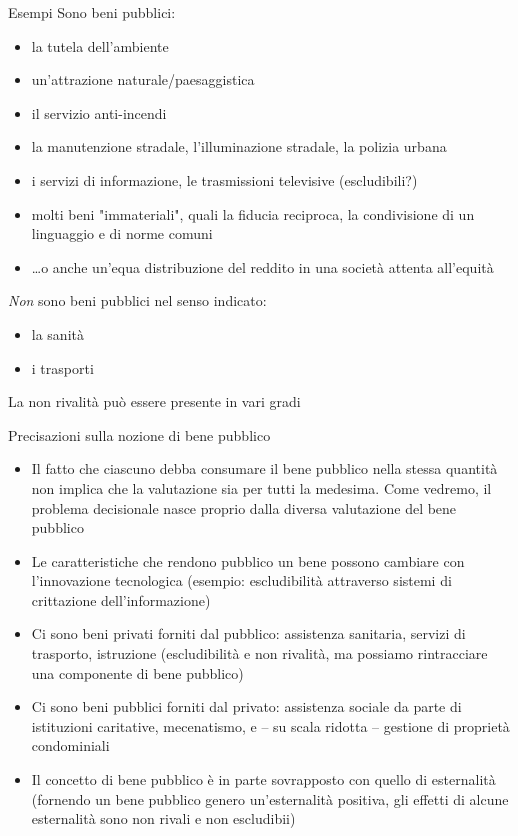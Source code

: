 \documentclass[aspectratio=64,11pt]{beamer}
\begin{document}
\begin{frame}{Esempi}
Sono beni pubblici:
\begin{itemize}
\item la tutela dell'ambiente
\item un'attrazione naturale/paesaggistica
\item il servizio anti-incendi
\item la manutenzione stradale, l'illuminazione stradale, la polizia urbana
\item i servizi di informazione, le trasmissioni televisive (escludibili?)
\item molti beni "immateriali", quali la fiducia reciproca, la condivisione di un linguaggio e di norme comuni
\item \ldots{}o anche un'equa distribuzione del reddito in una società attenta all'equità
\end{itemize}
\emph{Non} sono beni pubblici nel senso indicato:
\begin{itemize}
\item la sanità
\item i trasporti
\end{itemize}
La non rivalità può essere presente in vari gradi
\end{frame}


\begin{frame}{Precisazioni sulla nozione di bene pubblico}
\begin{itemize}
\item Il fatto che ciascuno debba consumare il bene pubblico nella stessa quantità non implica che la valutazione sia per tutti la medesima. Come vedremo, il problema decisionale nasce proprio dalla diversa valutazione del bene pubblico
\item Le caratteristiche che rendono pubblico un bene possono cambiare con l'innovazione tecnologica (esempio: escludibilità attraverso sistemi di crittazione dell'informazione)
\item Ci sono beni privati forniti dal pubblico: assistenza sanitaria, servizi di trasporto, istruzione (escludibilità e non rivalità, ma possiamo rintracciare una componente di bene pubblico)
\item Ci sono beni pubblici forniti dal privato: assistenza sociale da parte di istituzioni caritative, mecenatismo, e -- su scala ridotta -- gestione di proprietà condominiali
\item Il concetto di bene pubblico è in parte sovrapposto con quello di esternalità (fornendo un bene pubblico genero un'esternalità positiva, gli effetti di alcune esternalità sono non rivali e non escludibii)
\end{itemize}
\end{frame}
\end{document}
